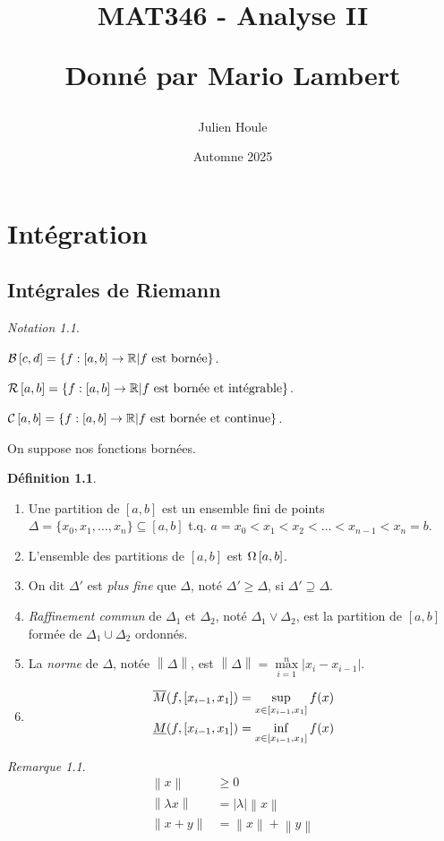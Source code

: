 \documentclass{report}
\title{MAT346 - Analyse II

Donn\'e par Mario Lambert}
\author{Julien Houle}
\date{Automne 2025}
\newcommand*{\raffinement}[2]{#1 \vee #2}
\newcommand*{\norme}[1]{\left\| #1 \right\|}
\newcommand*{\abs}[1]{\left| #1 \right|}
\newcommand*{\reels}{\mathbb{R}}
\theoremstyle{definition}
\newtheorem*{defin}{D\'efinition}
\theoremstyle{remark}
\newtheorem*{nota}{Notation}
\newtheorem*{rema}{Remarque}
\begin{document}
	\maketitle
	\tableofcontents
	\newpage

	\chapter{Int\'egration}
	\section{Int\'egrales de Riemann}

	\begin{nota}
		~

		$\bornee[c,d]=\left\lbrace f:[a,b] \to \reels \middle| f \text{ est born\'ee} \right\rbrace$.

		$\riemann=\left\lbrace f:[a,b] \to \reels \middle| f \text{ est born\'ee et int\'egrable} \right\rbrace$.

		$\continue=\left\lbrace f:[a,b] \to \reels \middle| f \text{ est born\'ee et continue} \right\rbrace$.
	\end{nota}

	On suppose nos fonctions born\'ees.

	\begin{defin}
		~

		\begin{enumerate}[label=\alph*)]
			\item Une partition de $[a,b]$ est un ensemble fini de points $\Delta=\{x_0,x_1,\dotsc,x_n\} \subseteq [a,b]$ t.q. $a=x_0 < x_1 < x_2 < \dotsc < x_{n-1} < x_n=b$.
			\item L'ensemble des partitions de $[a,b]$ est $\partitions$.
			\item On dit $\Delta'$ est \emph{plus fine} que $\Delta$, not\'e $\Delta' \geq \Delta$, si $\Delta' \supseteq \Delta$.
			\item \emph{Raffinement commun} de $\Delta_1$ et $\Delta_2$, not\'e $\raffinement{\Delta_1}{\Delta_2}$, est la partition de $[a,b]$ form\'ee de $\Delta_1 \cup \Delta_2$ ordonn\'es.
			\item La \emph{norme} de $\Delta$, not\'ee $\norme{\Delta}$, est $\norme{\Delta}=\displaystyle\max\limits_{i=1}^{n}\abs{x_i-x_{i-1}}$.
			\item
			\begin{align*}
				\msup{f}[\left[ x_{i-1},x_1 \right]]&= \displaystyle\sup\limits_{x \in \left[ x_{i-1},x_1 \right]}f(x)\\
				\minf{f}[\left[ x_{i-1},x_1 \right]]&= \displaystyle\inf\limits_{x \in \left[ x_{i-1},x_1 \right]}f(x)
			\end{align*}
		\end{enumerate}
		\begin{rema}
			\begin{align*}
				\norme{x}&\geq0\\
				\norme{\lambda x}&=\abs{\lambda} \norme{x}\\
				\norme{x+y}&= \norme{x} + \norme{y}
			\end{align*}
		\end{rema}
	\end{defin}
\end{document}
